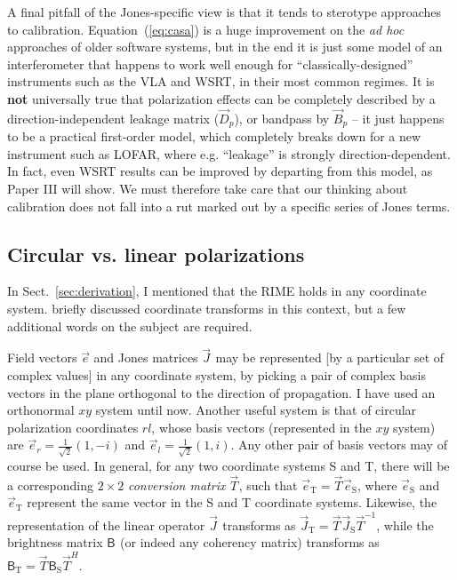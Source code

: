 \documentclass{aa}
\newcommand{\herm}{H}
\newcommand{\jones}[2]{\vec {#1}_{#2}}
\newcommand{\jonesinv}[2]{\vec {#1}^{-1}_{#2}}
\newcommand{\jonesT}[2]{\vec {#1}^{\herm}_{#2}}
\newcommand{\coh}[2]{\mathsf{{#1}}_{{#2}}}
\begin{document}
A final pitfall of the Jones-specific view is that it tends to sterotype approaches to calibration. Equation~(\ref{eq:casa}) is a huge improvement on the \emph{ad hoc} approaches of older software systems, but in the end it is just some model of an interferometer that happens to work well enough for ``classically-designed'' instruments such as the VLA and WSRT, in their most common regimes. It is {\bf not} universally true that polarization effects can be completely described by a direction-independent leakage matrix ($\jones{D}{p}$), or bandpass by $\jones{B}{p}$ -- it just happens to be a practical first-order model, which completely breaks down for a new instrument such as LOFAR, where e.g. ``leakage'' is strongly direction-dependent. In fact, even WSRT results can be improved by departing from this model, as Paper III \citep{RRIME3} will show. We must therefore take care that our thinking about calibration does not fall into a rut marked out by a specific series of Jones terms.

\subsection{\label{sec:circular}Circular vs. linear polarizations}

In Sect.~\ref{sec:derivation}, I mentioned that the RIME holds in any coordinate system. \citet{ME1} briefly 
discussed coordinate transforms in this context, but a few additional words on the subject are required.

Field vectors $\vec e$ and Jones matrices $\jones{J}{}$ may be represented [by a particular set of complex values] in any coordinate system, by picking a pair of complex basis vectors in the plane orthogonal to the direction of propagation. I have used an orthonormal $xy$ system until now. Another useful system is that of circular polarization coordinates $rl$, whose basis vectors (represented in the $xy$ system) are $\vec e_r=\frac{1}{\sqrt{2}}(1,-i)$ and $\vec e_l=\frac{1}{\sqrt{2}}(1,i)$. Any other pair of basis vectors may of course be used. In general, for any two coordinate systems S and T, there will be a corresponding $2\times2$ {\em conversion matrix} $\jones{T}{}$, such that $\vec e_\mathrm{T}=\jones{T}{} \vec e_\mathrm{S}$, where $\vec e_\mathrm{S}$ and $\vec e_\mathrm{T}$ represent the same vector in the S and T coordinate systems. Likewise, the representation of the linear operator $\jones{J}{}$ transforms as $\jones{J}{\mathrm{T}}=\jones{T}{} \jones{J}{\mathrm{S}} \jonesinv{T}{}$, while the brightness matrix $\coh{B}{}$ (or indeed any coherency matrix) transforms as $\coh{B}{\mathrm{T}}=\jones{T}{} \coh{B}{\mathrm{S}} \jonesT{T}{}.$
\end{document}
